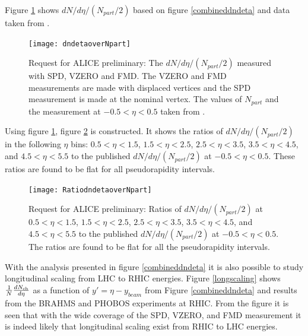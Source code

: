 \documentclass[11pt]{article}
\newcommand{\mult}[1][]{\ensuremath N_{\text{ch}#1}}
\newcommand{\dndeta}[1][]{{\ensuremath%
    \ifx|#1|\else\left.\fi%
    \frac{1}{N}\frac{d\mult{}}{d\eta}%
    \ifx|#1|\else\right|_{#1}\fi%
}}
\begin{document}
Figure \ref{dndetaoverNpart} shows $dN/d\eta/(N_{part}/2)$ based on
figure \ref{combineddndeta} and data taken from \cite{Aamodt:2010cz}.
\begin{figure}
  \centering
  \texttt{[image: dndetaoverNpart]}
  \caption{Request for ALICE preliminary: The $dN/d\eta/(N_{part}/2)$ measured with SPD, VZERO and FMD. The
    VZERO and FMD measurements are made with displaced vertices and
    the SPD measurement is made at the nominal vertex. The values of
    $N_{part}$ and the measurement at $-0.5<\eta<0.5$ taken from \cite{Aamodt:2010cz}.}
  \label{dndetaoverNpart}
\end{figure} 
Using figure \ref{dndetaoverNpart}, figure \ref{RatiodndetaoverNpart}
is constructed. It shows the ratios of $dN/d\eta/(N_{part}/2)$ in the
following $\eta$ bins:
$0.5<\eta<1.5$, $1.5<\eta<2.5$, $2.5<\eta<3.5$, $3.5<\eta<4.5$, and
$4.5<\eta<5.5$ to the published $dN/d\eta/(N_{part}/2)$ at $-0.5<\eta<0.5$. These
ratios are found to be flat for all pseudorapidity intervals.
\begin{figure}
  \centering
  \texttt{[image: RatiodndetaoverNpart]}
  \caption{Request for ALICE preliminary: Ratios of $dN/d\eta/(N_{part}/2)$ at
    $0.5<\eta<1.5$, $1.5<\eta<2.5$, $2.5<\eta<3.5$, $3.5<\eta<4.5$, and
    $4.5<\eta<5.5$ to the published $dN/d\eta/(N_{part}/2)$ at $-0.5<\eta<0.5$. The ratios are found to be flat for all the pseudorapidity intervals.}
  \label{RatiodndetaoverNpart}
\end{figure} 
With the analysis presented in figure \ref{combineddndeta} it is also
possible to study longitudinal scaling from LHC to RHIC
energies. Figure \ref{longscaling} shows $\dndeta$ as a function of
$y'=\eta-y_{beam}$ from Figure \ref{combineddndeta} and results from
the BRAHMS\cite{Bearden:2001qq} and PHOBOS\cite{Alver:2010ck}
experiments at RHIC. From the figure it is seen
that with the wide coverage of the SPD, VZERO, and FMD measurement it
is indeed likely that longitudinal scaling exist from RHIC to LHC
energies.
\end{document}
